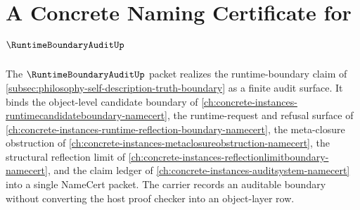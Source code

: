 \chapter{A Concrete Naming Certificate for $\RuntimeBoundaryAuditUp$}
\label{ch:concrete-instances-runtime-boundary-audit-namecert}

The $\RuntimeBoundaryAuditUp$ packet realizes the runtime-boundary claim of \autoref{subsec:philosophy-self-description-truth-boundary} as a finite audit surface. It binds the object-level candidate boundary of \autoref{ch:concrete-instances-runtimecandidateboundary-namecert}, the runtime-request and refusal surface of \autoref{ch:concrete-instances-runtime-reflection-boundary-namecert}, the meta-closure obstruction of \autoref{ch:concrete-instances-metaclosureobstruction-namecert}, the structural reflection limit of \autoref{ch:concrete-instances-reflectionlimitboundary-namecert}, and the claim ledger of \autoref{ch:concrete-instances-auditsystem-namecert} into a single NameCert packet. The carrier records an auditable boundary without converting the host proof checker into an object-layer row.

